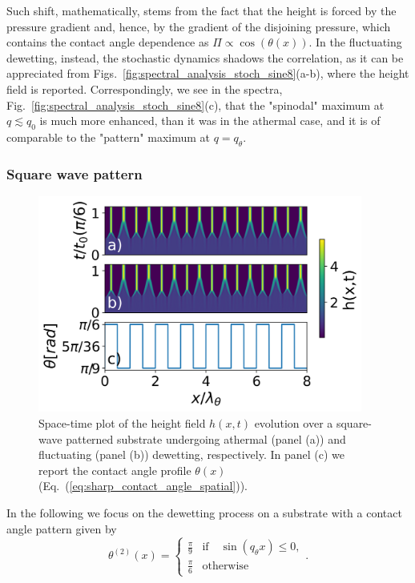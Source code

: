 Such shift, mathematically, stems from the fact that the height is forced by the pressure gradient and, hence, by the gradient of the disjoining pressure, which contains the contact angle dependence as $\Pi \propto \cos(\theta(x))$.
In the fluctuating dewetting, instead, the stochastic dynamics shadows the correlation, as it can be appreciated from Figs.~\ref{fig:spectral_analysis_stoch_sine8}(a-b), where the height field is reported. 
Correspondingly, we see in the spectra, Fig.~\ref{fig:spectral_analysis_stoch_sine8}(c), that the "spinodal" maximum at $q \lesssim q_0$ is much more enhanced, than it was in the athermal case, and it is of comparable to the "pattern" maximum at $q = q_{\theta}$.
\subsubsection{Square wave pattern}\label{subsubsec:square_wave}
\begin{figure}
    \centering
    \includegraphics[width=0.95\textwidth]{graphics/spacedepCA_['delta', '1e7', '10', 25, '9_3', 2000000.0]_v2.png}
    \caption{Space-time plot of the height field $h(x,t)$ evolution over a square-wave patterned substrate undergoing athermal 
    (panel (a)) and fluctuating (panel (b)) dewetting, respectively. In panel (c) we report the contact angle profile $\theta(x)$ (Eq.~(\ref{eq:sharp_contact_angle_spatial})).} 
    \label{fig:patterned_step8_difference_20-30}
\end{figure}
In the following we focus on the dewetting process on a substrate with a contact angle pattern given by 
\begin{equation}\label{eq:sharp_contact_angle_spatial}
    {\theta^{(2)}(x)} = 
    \left\{
    \begin{array}{ll}
        \frac{\pi}{9} & \text{if} \quad\sin(q_{\theta}x) \leq 0, \\
        \frac{\pi}{6} & \text{otherwise}
    \end{array}
    \right..
\end{equation}
